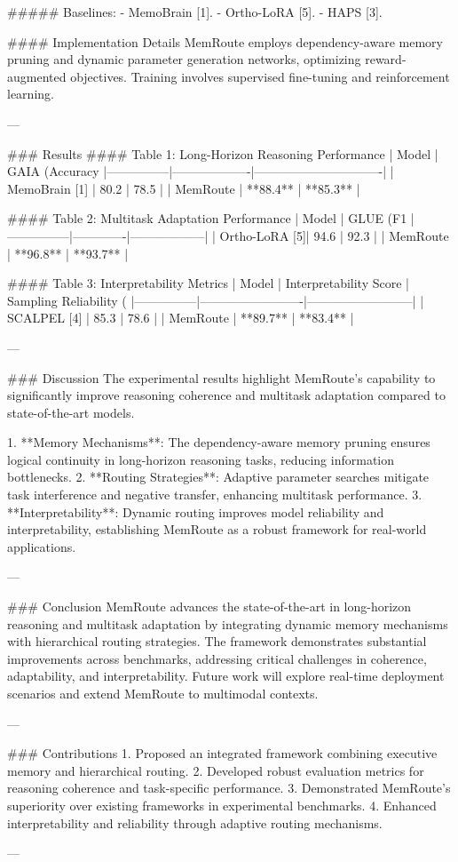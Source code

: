 ##### Baselines:  
- MemoBrain [1].  
- Ortho-LoRA [5].  
- HAPS [3].  

#### Implementation Details  
MemRoute employs dependency-aware memory pruning and dynamic parameter generation networks, optimizing reward-augmented objectives. Training involves supervised fine-tuning and reinforcement learning.

---

### Results  
#### Table 1: Long-Horizon Reasoning Performance  
| Model         | GAIA (Accuracy %
|---------------|-------------------|-------------------------------|  
| MemoBrain [1] | 80.2              | 78.5                          |  
| MemRoute      | **88.4**          | **85.3**                      |  

#### Table 2: Multitask Adaptation Performance  
| Model         | GLUE (F1 %
|---------------|-------------|------------------|  
| Ortho-LoRA [5]| 94.6        | 92.3             |  
| MemRoute      | **96.8**    | **93.7**         |  

#### Table 3: Interpretability Metrics  
| Model         | Interpretability Score | Sampling Reliability (%
|---------------|-------------------------|--------------------------|  
| SCALPEL [4]   | 85.3                   | 78.6                     |  
| MemRoute      | **89.7**               | **83.4**                 |  

---

### Discussion  
The experimental results highlight MemRoute's capability to significantly improve reasoning coherence and multitask adaptation compared to state-of-the-art models.  

1. **Memory Mechanisms**: The dependency-aware memory pruning ensures logical continuity in long-horizon reasoning tasks, reducing information bottlenecks.  
2. **Routing Strategies**: Adaptive parameter searches mitigate task interference and negative transfer, enhancing multitask performance.  
3. **Interpretability**: Dynamic routing improves model reliability and interpretability, establishing MemRoute as a robust framework for real-world applications.

---

### Conclusion  
MemRoute advances the state-of-the-art in long-horizon reasoning and multitask adaptation by integrating dynamic memory mechanisms with hierarchical routing strategies. The framework demonstrates substantial improvements across benchmarks, addressing critical challenges in coherence, adaptability, and interpretability. Future work will explore real-time deployment scenarios and extend MemRoute to multimodal contexts.

---

### Contributions  
1. Proposed an integrated framework combining executive memory and hierarchical routing.  
2. Developed robust evaluation metrics for reasoning coherence and task-specific performance.  
3. Demonstrated MemRoute's superiority over existing frameworks in experimental benchmarks.  
4. Enhanced interpretability and reliability through adaptive routing mechanisms.

---